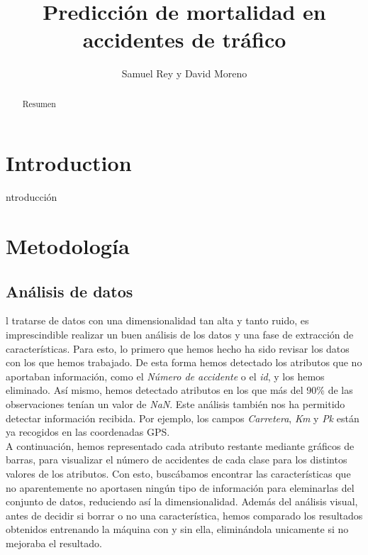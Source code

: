 \documentclass[journal,twoside]{JoPhA}
\begin{document}
\title{Predicción de mortalidad en accidentes de tráfico}
 
\author{Samuel Rey y David Moreno
}


\maketitle


\begin{abstract}
	
Resumen
\end{abstract}


\section{Introduction}




ntroducción 

\section{Metodología}
\subsection{Análisis de datos}
l tratarse de datos con una dimensionalidad tan alta y tanto ruido, es imprescindible realizar un buen análisis de los datos y una fase de extracción de características. Para esto, lo primero que hemos hecho ha sido revisar los datos con los que hemos trabajado. De esta forma hemos detectado los atributos que no aportaban información, como el \textit{Número de accidente} o el \textit{id}, y los hemos eliminado. Así mismo, hemos detectado atributos en los que más del 90\% de las observaciones tenían un valor de \textit{NaN}. Este análisis también nos ha permitido detectar información recibida. Por ejemplo, los campos \textit{Carretera}, \textit{Km} y \textit{Pk} están ya recogidos en las coordenadas GPS. \\

A continuación, hemos representado cada atributo restante mediante gráficos de barras, para visualizar el número de accidentes de cada clase para los distintos valores de los atributos. Con esto, buscábamos encontrar las características que no aparentemente no aportasen ningún tipo de información para eleminarlas del conjunto de datos, reduciendo así la dimensionalidad. Además del análisis visual, antes de decidir si borrar o no una característica, hemos comparado los resultados obtenidos entrenando la máquina con y sin ella, eliminándola unicamente si no mejoraba el resultado. \\
\end{document}
